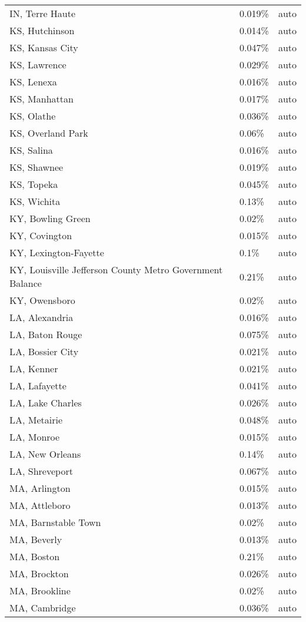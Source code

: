 \begin{longtable}[]{@{}lll@{}}
IN, Terre Haute & 0.019\% & auto \\
KS, Hutchinson & 0.014\% & auto \\
KS, Kansas City & 0.047\% & auto \\
KS, Lawrence & 0.029\% & auto \\
KS, Lenexa & 0.016\% & auto \\
KS, Manhattan & 0.017\% & auto \\
KS, Olathe & 0.036\% & auto \\
KS, Overland Park & 0.06\% & auto \\
KS, Salina & 0.016\% & auto \\
KS, Shawnee & 0.019\% & auto \\
KS, Topeka & 0.045\% & auto \\
KS, Wichita & 0.13\% & auto \\
KY, Bowling Green & 0.02\% & auto \\
KY, Covington & 0.015\% & auto \\
KY, Lexington-Fayette & 0.1\% & auto \\
KY, Louisville Jefferson County Metro Government Balance & 0.21\% &
auto \\
KY, Owensboro & 0.02\% & auto \\
LA, Alexandria & 0.016\% & auto \\
LA, Baton Rouge & 0.075\% & auto \\
LA, Bossier City & 0.021\% & auto \\
LA, Kenner & 0.021\% & auto \\
LA, Lafayette & 0.041\% & auto \\
LA, Lake Charles & 0.026\% & auto \\
LA, Metairie & 0.048\% & auto \\
LA, Monroe & 0.015\% & auto \\
LA, New Orleans & 0.14\% & auto \\
LA, Shreveport & 0.067\% & auto \\
MA, Arlington & 0.015\% & auto \\
MA, Attleboro & 0.013\% & auto \\
MA, Barnstable Town & 0.02\% & auto \\
MA, Beverly & 0.013\% & auto \\
MA, Boston & 0.21\% & auto \\
MA, Brockton & 0.026\% & auto \\
MA, Brookline & 0.02\% & auto \\
MA, Cambridge & 0.036\% & auto \\

\end{longtable}
